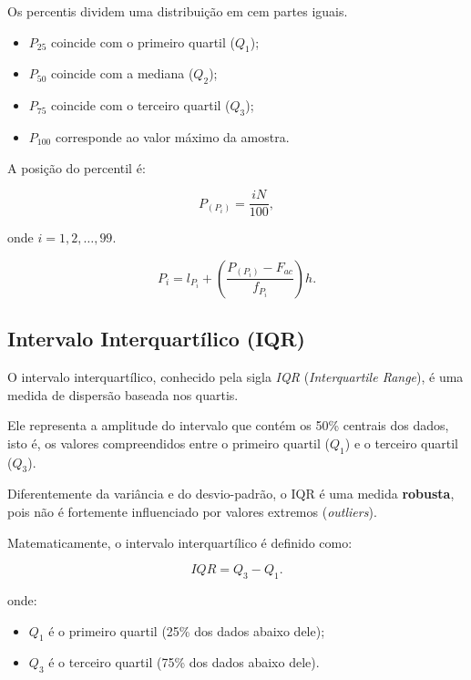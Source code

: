 Os percentis dividem uma distribuição em cem partes iguais.

\begin{itemize}
    \item $P_{25}$ coincide com o primeiro quartil ($Q_1$);
    \item $P_{50}$ coincide com a mediana ($Q_2$);
    \item $P_{75}$ coincide com o terceiro quartil ($Q_3$);
    \item $P_{100}$ corresponde ao valor máximo da amostra.
\end{itemize}

A posição do percentil é:

\begin{equation}
P_{(P_i)}=\frac{iN}{100},
\end{equation}

onde $i=1,2,\ldots,99$.

\begin{equation}\label{eq:percentil}
P_i=
l_{P_i}+
\left(
\frac{P_{(P_i)}-F_{ac}}{f_{P_i}}
\right)h.
\end{equation}


\subsection{Intervalo Interquartílico (IQR)}

O intervalo interquartílico, conhecido pela sigla \textit{IQR}
(\textit{Interquartile Range}), é uma medida de dispersão baseada nos quartis. \vskip0.3cm

Ele representa a amplitude do intervalo que contém os 50\% centrais dos dados,
isto é, os valores compreendidos entre o primeiro quartil ($Q_1$) e o terceiro
quartil ($Q_3$). \vskip0.3cm

Diferentemente da variância e do desvio-padrão, o IQR é uma medida
\textbf{robusta}, pois não é fortemente influenciado por valores extremos
(\textit{outliers}). \vskip0.3cm

Matematicamente, o intervalo interquartílico é definido como:

\begin{equation}\label{eq:iqr}
IQR = Q_3 - Q_1.
\end{equation}

onde:

\begin{itemize}
    \item $Q_1$ é o primeiro quartil (25\% dos dados abaixo dele);
    \item $Q_3$ é o terceiro quartil (75\% dos dados abaixo dele).
\end{itemize}

